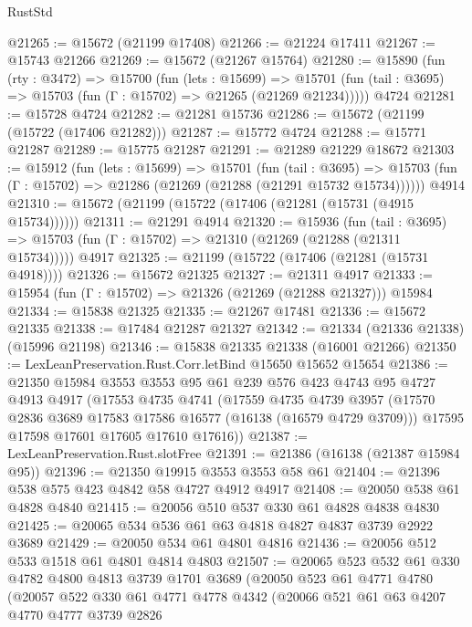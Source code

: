 \begin{lexlean}{RustStd}
\begin{coremodule}
@21265 := @15672 (@21199 @17408)
@21266 := @21224 @17411
@21267 := @15743 @21266
@21269 := @15672 (@21267 @15764)
@21280 := @15890
    (fun (rty : @3472) =>
    @15700
      (fun (lets : @15699) =>
      @15701 (fun (tail : @3695) => @15703 (fun (Γ : @15702) => @21265 (@21269 @21234)))))
    @4724
@21281 := @15728 @4724
@21282 := @21281 @15736
@21286 := @15672 (@21199 (@15722 (@17406 @21282)))
@21287 := @15772 @4724
@21288 := @15771 @21287
@21289 := @15775 @21287
@21291 := @21289 @21229 @18672
@21303 := @15912
    (fun (lets : @15699) =>
    @15701
      (fun (tail : @3695) =>
      @15703 (fun (Γ : @15702) => @21286 (@21269 (@21288 (@21291 @15732 @15734))))))
    @4914
@21310 := @15672 (@21199 (@15722 (@17406 (@21281 (@15731 (@4915 @15734))))))
@21311 := @21291 @4914
@21320 := @15936
    (fun (tail : @3695) => @15703 (fun (Γ : @15702) => @21310 (@21269 (@21288 (@21311 @15734)))))
    @4917
@21325 := @21199 (@15722 (@17406 (@21281 (@15731 @4918))))
@21326 := @15672 @21325
@21327 := @21311 @4917
@21333 := @15954 (fun (Γ : @15702) => @21326 (@21269 (@21288 @21327))) @15984
@21334 := @15838 @21325
@21335 := @21267 @17481
@21336 := @15672 @21335
@21338 := @17484 @21287 @21327
@21342 := @21334 (@21336 @21338) (@15996 @21198)
@21346 := @15838 @21335 @21338 (@16001 @21266)
@21350 := LexLeanPreservation.Rust.Corr.letBind @15650 @15652 @15654
@21386 := @21350
    @15984
    @3553
    @3553
    @95
    @61
    @239
    @576
    @423
    @4743
    @95
    @4727
    @4913
    @4917
    (@17553
      @4735
      @4741
      (@17559
        @4735
        @4739
        @3957
        (@17570 @2836 @3689 @17583 @17586 @16577 (@16138 (@16579 @4729 @3709)))
        @17595
        @17598
        @17601
        @17605
        @17610
        @17616))
@21387 := LexLeanPreservation.Rust.slotFree
@21391 := @21386 (@16138 (@21387 @15984 @95))
@21396 := @21350 @19915 @3553 @3553 @58 @61
@21404 := @21396 @538 @575 @423 @4842 @58 @4727 @4912 @4917
@21408 := @20050 @538 @61 @4828 @4840
@21415 := @20056 @510 @537 @330 @61 @4828 @4838 @4830
@21425 := @20065 @534 @536 @61 @63 @4818 @4827 @4837 @3739 @2922 @3689
@21429 := @20050 @534 @61 @4801 @4816
@21436 := @20056 @512 @533 @1518 @61 @4801 @4814 @4803
@21507 := @20065
    @523
    @532
    @61
    @330
    @4782
    @4800
    @4813
    @3739
    @1701
    @3689
    (@20050
      @523
      @61
      @4771
      @4780
      (@20057
        @522
        @330
        @61
        @4771
        @4778
        @4342
        (@20066
          @521
          @61
          @63
          @4207
          @4770
          @4777
          @3739
          @2826

\end{coremodule}
\end{lexlean}
